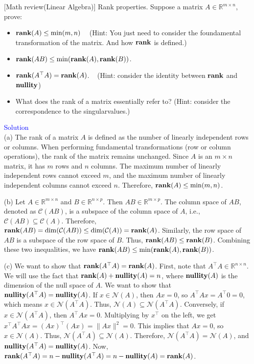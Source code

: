 \item {} [Math review(Linear Algebra)] Rank properties. Suppose a matrix $A\in \mathbb{R}^{m\times n}$, prove:
\begin{itemize}
    \item[(a)] $\mathop{\bf rank}(A)\leq \min(m, n)$ ~ (Hint: You just need to consider the foundamental transformation of the matrix. And how $\mathop{\bf rank}$ is defined.)
    \item[(b)] $\mathop{\bf rank}(AB)\leq \min(\mathop{\bf rank}(A),\mathop{\bf rank}(B))$. ~
    \item[(c)] $\mathop{\bf rank}(A^{\top}A)=\mathop{\bf rank}(A)$. ~ (Hint: consider the identity between $\mathop{\bf rank}$ and $\textbf{nullity}$)
    \item[(d)] What does the rank of a matrix essentially refer to? (Hint: consider the correspondence to the singularvalues.) ~
\end{itemize}

\textcolor{blue}{Solution} \\

(a) The rank of a matrix $A$ is defined as the number of linearly independent rows or columns. When performing fundamental transformations (row or column operations), the rank of the matrix remains unchanged.  Since $A$ is an $m \times n$ matrix, it has $m$ rows and $n$ columns. The maximum number of linearly independent rows cannot exceed $m$, and the maximum number of linearly independent columns cannot exceed $n$. Therefore, $\mathop{\bf rank}(A) \leq \min(m, n)$.

(b) Let $A \in \mathbb{R}^{m \times n}$ and $B \in \mathbb{R}^{n \times p}$. Then $AB \in \mathbb{R}^{m \times p}$. The column space of $AB$, denoted as $\mathcal{C}(AB)$, is a subspace of the column space of $A$, i.e., $\mathcal{C}(AB) \subseteq \mathcal{C}(A)$. Therefore, $\mathop{\bf rank}(AB) = \dim(\mathcal{C}(AB)) \leq \dim(\mathcal{C}(A)) = \mathop{\bf rank}(A)$.
Similarly, the row space of $AB$ is a subspace of the row space of $B$. Thus, $\mathop{\bf rank}(AB) \leq \mathop{\bf rank}(B)$. Combining these two inequalities, we have $\mathop{\bf rank}(AB) \leq \min(\mathop{\bf rank}(A), \mathop{\bf rank}(B))$.

(c) We want to show that $\mathop{\bf rank}(A^{\top}A) = \mathop{\bf rank}(A)$.
First, note that $A^{\top}A \in \mathbb{R}^{n \times n}$. We will use the fact that $\mathop{\bf rank}(A) + \textbf{nullity}(A) = n$, where $\textbf{nullity}(A)$ is the dimension of the null space of $A$.
We want to show that $\textbf{nullity}(A^{\top}A) = \textbf{nullity}(A)$.
If $x \in \mathcal{N}(A)$, then $Ax = 0$, so $A^{\top}Ax = A^{\top}0 = 0$, which means $x \in \mathcal{N}(A^{\top}A)$. Thus, $\mathcal{N}(A) \subseteq \mathcal{N}(A^{\top}A)$.
Conversely, if $x \in \mathcal{N}(A^{\top}A)$, then $A^{\top}Ax = 0$. Multiplying by $x^{\top}$ on the left, we get $x^{\top}A^{\top}Ax = (Ax)^{\top}(Ax) = \|Ax\|^2 = 0$. This implies that $Ax = 0$, so $x \in \mathcal{N}(A)$. Thus, $\mathcal{N}(A^{\top}A) \subseteq \mathcal{N}(A)$.
Therefore, $\mathcal{N}(A^{\top}A) = \mathcal{N}(A)$, and $\textbf{nullity}(A^{\top}A) = \textbf{nullity}(A)$.
Now, $\mathop{\bf rank}(A^{\top}A) = n - \textbf{nullity}(A^{\top}A) = n - \textbf{nullity}(A) = \mathop{\bf rank}(A)$.


